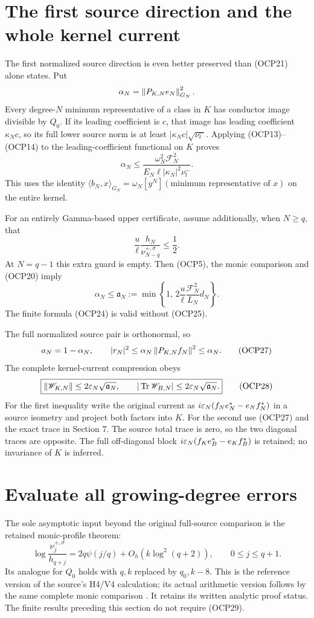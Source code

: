 \documentclass[10pt]{article}
\begin{document}
\section[The first source direction and the kernel current]{The first source direction and the whole kernel current}
The first normalized source direction is even better preserved than (OCP21) alone states. Put
\[
 \alpha_N=\left\lVert P_{K,N}e_N\right\rVert_{G_N}^2.
\]
Every degree-$N$ minimum representative of a class in $K$ has conductor image divisible by $Q_0$. If its leading coefficient is $c$, that image has leading coefficient $\kappa_Nc$, so its full lower source norm is at least $|\kappa_Nc|\sqrt{\nu_t^-}$. Applying (OCP13)--(OCP14) to the leading-coefficient functional on $K$ proves
\[
 \boxed{\alpha_N\le
 \frac{\omega_N^2\mathcal F_N^2}
 {E_N\ell|\kappa_N|^2\nu_t^-}.}
 \tag{OCP24}
\]
This uses the identity $\langle b_N,x\rangle_{G_N}=\omega_N[y^N](\text{minimum representative of }x)$ on the entire kernel.

For an entirely Gamma-based upper certificate, assume additionally, when $N\ge q$, that
\[
 \frac u\ell\frac{h_N}{\nu_{N-q}^{+,\sigma}}\le\frac12.
 \tag{OCP25}
\]
At $N=q-1$ this extra guard is empty. Then (OCP5), the monic comparison and (OCP20) imply
\[
 \boxed{\alpha_N\le\mathfrak a_N:=
 \min\left\{1,\,2\frac u\ell\frac{\mathcal F_N^2}{L_N}d_N\right\}.}
 \tag{OCP26}
\]
The finite formula (OCP24) is valid without (OCP25).

The full normalized source pair is orthonormal, so
\[
 a_N=1-\alpha_N,\qquad
 |r_N|^2\le\alpha_N\left\lVert P_{K,N}f_N\right\rVert^2\le\alpha_N.
 \tag{OCP27}
\]
The complete kernel-current compression obeys
\[
 \boxed{\left\lVert\mathscr W_{K,N}\right\rVert\le2\varepsilon_N\sqrt{\mathfrak a_N},\qquad
 |\operatorname{Tr}\mathscr W_{B,N}|\le2\varepsilon_N\sqrt{\mathfrak a_N}.}
 \tag{OCP28}
\]
For the first inequality write the original current as
$i\varepsilon_N(f_Ne_N^*-e_Nf_N^*)$ in a source isometry and project both factors into $K$. For the second use (OCP27) and the exact trace in Section 7. The source total trace is zero, so the two diagonal traces are opposite. The full off-diagonal block $i\varepsilon_N(f_Ke_B^*-e_Kf_B^*)$ is retained; no invariance of $K$ is inferred.

\section{Evaluate all growing-degree errors}
The sole asymptotic input beyond the original full-source comparison is the retained monic-profile theorem:
\[
 \log\frac{\nu_j^{+,\sigma}}{h_{q+j}}
 =2q\psi(j/q)+O_h(k\log^2(q+2)),\qquad0\le j\le q+1.
 \tag{OCP29}
\]
Its analogue for $Q_0$ holds with $q,k$ replaced by $q_0,k-8$. This is the reference version of the source's H4/V4 calculation; its actual arithmetic version follows by the same complete monic comparison \cite{heat,lrc}. It retains its written analytic proof status. The finite results preceding this section do not require (OCP29).
\end{document}
